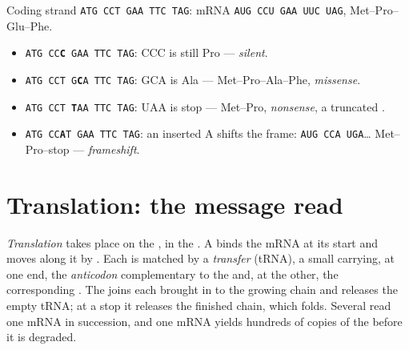 \begin{example}\label{ex:g11:gene-expression:outcomes}
Coding strand \texttt{ATG CCT GAA TTC TAG}: mRNA
\texttt{AUG CCU GAA UUC UAG},  Met--Pro--Glu--Phe.
\begin{itemize}
  \item \texttt{ATG CC\textbf{C} GAA TTC TAG}: CCC is still Pro ---
        \emph{silent}.
  \item \texttt{ATG CCT G\textbf{C}A TTC TAG}: GCA is Ala ---
        Met--Pro--Ala--Phe, \emph{missense}.
  \item \texttt{ATG CCT \textbf{T}AA TTC TAG}: UAA is stop ---
        Met--Pro, \emph{nonsense}, a truncated .
  \item \texttt{ATG CC\textbf{A}T GAA TTC TAG}: an inserted A shifts
        the frame: \texttt{AUG CCA UGA}\dots{} Met--Pro--stop ---
        \emph{frameshift}.
\end{itemize}
\end{example}

\section{Translation: the message read}

\begin{proposition}[Translation]\label{prop:g11:gene-expression:translation}
\emph{Translation} takes place on the
\emph{}, in the . A  binds the mRNA at its
start  and moves along it  by . Each  is matched
by a \emph{transfer } (tRNA), a small  carrying, at one end,
the  \emph{anticodon} complementary to the  and,
at the other, the corresponding . The  joins each
 brought in to the growing chain and releases the empty tRNA;
at a stop  it releases the finished chain, which folds. Several
 read one mRNA in succession, and one mRNA yields hundreds
of copies of the  before it is degraded.
\end{proposition}
\admitted

